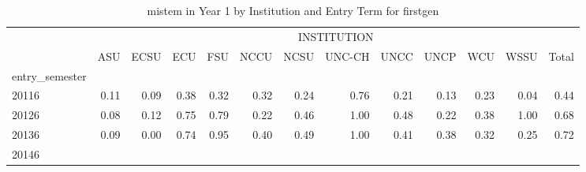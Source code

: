 \begin{table}[!h]
\caption{mistem in Year 1 by Institution and Entry Term for firstgen}
\centering
\begin{tabular}{lllllllllllll}
\cline{1-13}
\multicolumn{1}{c}{} &
  \multicolumn{12}{|c}{INSTITUTION} \\
\multicolumn{1}{c}{} &
  \multicolumn{1}{|r}{ASU} &
  \multicolumn{1}{r}{ECSU} &
  \multicolumn{1}{r}{ECU} &
  \multicolumn{1}{r}{FSU} &
  \multicolumn{1}{r}{NCCU} &
  \multicolumn{1}{r}{NCSU} &
  \multicolumn{1}{r}{UNC-CH} &
  \multicolumn{1}{r}{UNCC} &
  \multicolumn{1}{r}{UNCP} &
  \multicolumn{1}{r}{WCU} &
  \multicolumn{1}{r}{WSSU} &
  \multicolumn{1}{r}{Total} \\
\cline{1-13}
\multicolumn{1}{l}{entry\_semester} &
  \multicolumn{1}{|r}{} &
  \multicolumn{1}{r}{} &
  \multicolumn{1}{r}{} &
  \multicolumn{1}{r}{} &
  \multicolumn{1}{r}{} &
  \multicolumn{1}{r}{} &
  \multicolumn{1}{r}{} &
  \multicolumn{1}{r}{} &
  \multicolumn{1}{r}{} &
  \multicolumn{1}{r}{} &
  \multicolumn{1}{r}{} &
  \multicolumn{1}{r}{} \\
\multicolumn{1}{l}{\hspace{1em}20116} &
  \multicolumn{1}{|r}{0.11} &
  \multicolumn{1}{r}{0.09} &
  \multicolumn{1}{r}{0.38} &
  \multicolumn{1}{r}{0.32} &
  \multicolumn{1}{r}{0.32} &
  \multicolumn{1}{r}{0.24} &
  \multicolumn{1}{r}{0.76} &
  \multicolumn{1}{r}{0.21} &
  \multicolumn{1}{r}{0.13} &
  \multicolumn{1}{r}{0.23} &
  \multicolumn{1}{r}{0.04} &
  \multicolumn{1}{r}{0.44} \\
\multicolumn{1}{l}{\hspace{1em}20126} &
  \multicolumn{1}{|r}{0.08} &
  \multicolumn{1}{r}{0.12} &
  \multicolumn{1}{r}{0.75} &
  \multicolumn{1}{r}{0.79} &
  \multicolumn{1}{r}{0.22} &
  \multicolumn{1}{r}{0.46} &
  \multicolumn{1}{r}{1.00} &
  \multicolumn{1}{r}{0.48} &
  \multicolumn{1}{r}{0.22} &
  \multicolumn{1}{r}{0.38} &
  \multicolumn{1}{r}{1.00} &
  \multicolumn{1}{r}{0.68} \\
\multicolumn{1}{l}{\hspace{1em}20136} &
  \multicolumn{1}{|r}{0.09} &
  \multicolumn{1}{r}{0.00} &
  \multicolumn{1}{r}{0.74} &
  \multicolumn{1}{r}{0.95} &
  \multicolumn{1}{r}{0.40} &
  \multicolumn{1}{r}{0.49} &
  \multicolumn{1}{r}{1.00} &
  \multicolumn{1}{r}{0.41} &
  \multicolumn{1}{r}{0.38} &
  \multicolumn{1}{r}{0.32} &
  \multicolumn{1}{r}{0.25} &
  \multicolumn{1}{r}{0.72} \\
\multicolumn{1}{l}{\hspace{1em}20146} &

\end{tabular}
\end{table}
